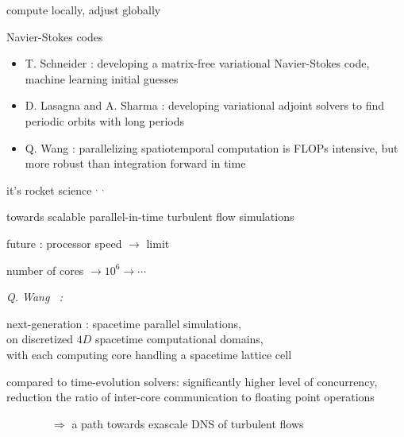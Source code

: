 \begin{frame}{compute locally, adjust globally}
\begin{block}{Navier-Stokes codes}
\begin{itemize}
 \item
T. Schneider : developing a matrix-free variational Navier-Stokes code,
machine learning initial guesses
 \item
D. Lasagna and A. Sharma  : developing variational adjoint solvers to
find periodic orbits with long periods
 \item
Q. Wang : parallelizing {\color{red}spatiotemporal}
computation is FLOPs intensive, but more robust than
integration forward in time
\end{itemize}
\end{block}

\vfill\hfill
it's rocket science%
$^,$%
$^,$%
\end{frame}

\begin{frame}{
towards scalable parallel-in-time turbulent flow simulations
}
\begin{block}{future :}%
processor speed $\to$ limit

\medskip

number of cores $\to 10^6 \to \cdots$

\medskip
\end{block}

\emph{Q. Wang%
    \,%
    :} %

next-generation : spacetime parallel
simulations, \\
on discretized $4D$ spacetime
computational domains, \\
with each computing core handling a spacetime lattice cell

\bigskip

compared to time-evolution solvers:
significantly higher level of concurrency, reduction the ratio of
inter-core communication to floating point operations

\bigskip

$\qquad\qquad\Rightarrow$ a path towards exascale DNS of turbulent flows
\end{frame}

